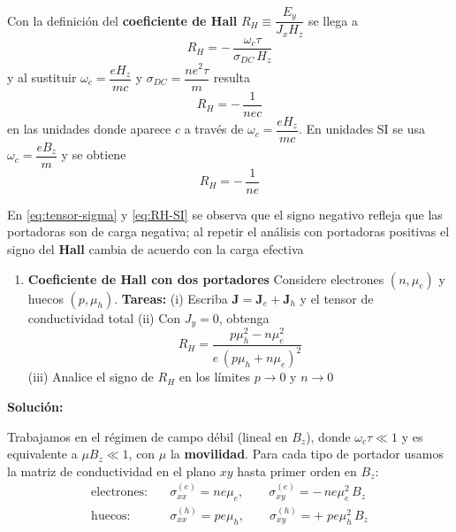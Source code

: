 \documentclass{article}
\newenvironment{AGbox}[1][7]%
{%
  \begin{tcolorbox}[
    enhanced, breakable,
    colframe=AppleGreen,
    colback=AppleGreen!#1,
    boxrule=1pt,
    borderline west={2mm}{-10mm}{AppleGreen},
    sharp corners=southwest,
    left=14pt,right=14pt,top=10pt,bottom=10pt,
     boxsep=6pt,
  ]%
}{%
  \end{tcolorbox}%
}
\begin{document}
Con la definición del \textcolor{Cerulean}{\textbf{coeficiente de Hall}} $R_H\equiv\dfrac{E_y}{J_x H_z}$ se llega a
\begin{equation}\label{eq:RH-final}
R_H=-\,\frac{\omega_c\tau}{\sigma_{DC}\,H_z}
\end{equation}
y al sustituir $\omega_c=\dfrac{eH_z}{mc}$ y $\sigma_{DC}=\dfrac{ne^2\tau}{m}$ resulta
\begin{equation}\label{eq:RH-cgs}
R_H=-\,\frac{1}{n e c}
\end{equation}
en las unidades donde aparece $c$ a través de $\omega_c=\dfrac{eH_z}{mc}$. En unidades SI se usa $\omega_c=\dfrac{eB_z}{m}$ y se obtiene
\begin{equation}\label{eq:RH-SI}
R_H=-\,\frac{1}{n e}
\end{equation}

En \eqref{eq:tensor-sigma} y \eqref{eq:RH-SI} se observa que el signo negativo refleja que las portadoras son de carga negativa; al repetir el análisis con portadoras positivas el signo del \textcolor{Cerulean}{\textbf{Hall}} cambia de acuerdo con la carga efectiva


\begin{AGbox}[8]
\begin{enumerate}[label={{\textcolor{trueblue}{\textbf{Pr.} \arabic*.2}}}, start=2]
  \item \textcolor{Cerulean}{\textbf{Coeficiente de Hall con dos portadores}}
  Considere electrones $(n,\mu_e)$ y huecos $(p,\mu_h)$. 
  \textbf{Tareas:}
  (i) Escriba $\mathbf J=\mathbf J_e+\mathbf J_h$ y el tensor de conductividad total
  (ii) Con $J_y=0$, obtenga
  \begin{equation}\label{eq:RH-2carriers}
    R_H=\frac{p\mu_h^2-n\mu_e^2}{e\,(p\mu_h+n\mu_e)^2}
  \end{equation}
  (iii) Analice el signo de $R_H$ en los límites $p\to 0$ y $n\to 0$
\end{enumerate}
\end{AGbox}

\vspace{0.5cm}\textcolor{Cinnabar}{\textbf{Solución:}}

Trabajamos en el régimen de campo débil (lineal en $B_z$), donde $\omega_c\tau\ll1$ y es equivalente a $\mu B_z\ll1$, con $\mu$ la \textcolor{Cerulean}{\textbf{movilidad}}. Para cada tipo de portador usamos la matriz de conductividad en el plano $xy$ hasta primer orden en $B_z$:
\begin{equation}\label{eq:sigma-e-h}
\begin{aligned}
\text{electrones:}\quad &\sigma^{(e)}_{xx}=n e \mu_e,\qquad \sigma^{(e)}_{xy}=-\,n e \mu_e^{2}\,B_z\\
\text{huecos:}\quad &\sigma^{(h)}_{xx}=p e \mu_h,\qquad \sigma^{(h)}_{xy}=+\;p e \mu_h^{2}\,B_z
\end{aligned}
\end{equation}
\end{document}
